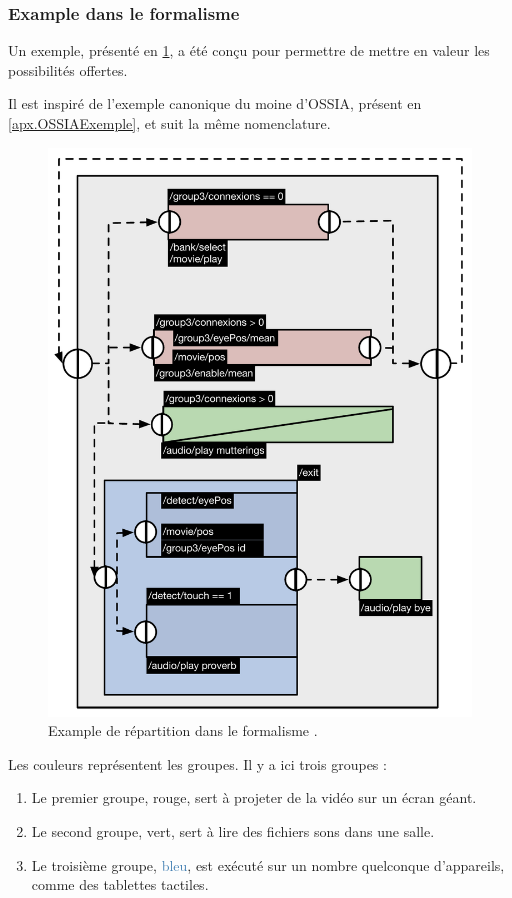 \subsubsection{Example dans le formalisme}
Un exemple, présenté en \cref{fig.RepartOSSIA}, a été conçu pour permettre de mettre en valeur les possibilités offertes.

Il est inspiré de l'exemple canonique du moine d'\ac{OSSIA}, présent en \cref{apx.OSSIAExemple}, et suit la même nomenclature.

\begin{figure}[h]
	\centering
	\includegraphics[scale=0.7]{images/ossiaDistri.pdf}
	\caption{Example de répartition dans le formalisme .}
	\label{fig.RepartOSSIA}
\end{figure}

Les couleurs représentent les groupes.
Il y a ici trois groupes : 

\begin{enumerate}
	\item Le premier groupe, \textcolor{BrickRed}{rouge}, sert à projeter de la vidéo sur un écran géant.
	\item Le second groupe, \textcolor{OliveGreen}{vert}, sert à lire des fichiers sons dans une salle.
	\item Le troisième groupe, \textcolor{SteelBlue}{bleu}, est exécuté sur un nombre quelconque d'appareils, comme des tablettes tactiles.  
\end{enumerate}


